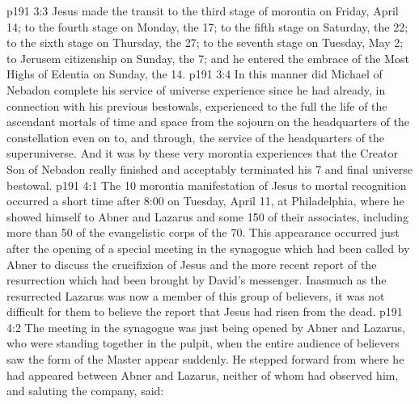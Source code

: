 \vs p191 3:3 Jesus made the transit to the third stage of morontia on Friday, April 14; to the fourth stage on Monday, the 17; to the fifth stage on Saturday, the 22; to the sixth stage on Thursday, the 27; to the seventh stage on Tuesday, May 2; to Jerusem citizenship on Sunday, the 7; and he entered the embrace of the Most Highs of Edentia on Sunday, the 14.
\vs p191 3:4 In this manner did Michael of Nebadon complete his service of universe experience since he had already, in connection with his previous bestowals, experienced to the full the life of the ascendant mortals of time and space from the sojourn on the headquarters of the constellation even on to, and through, the service of the headquarters of the superuniverse. And it was by these very morontia experiences that the Creator Son of Nebadon really finished and acceptably terminated his 7 and final universe bestowal.
\vs p191 4:1 The 10 morontia manifestation of Jesus to mortal recognition occurred a short time after 8:00 on Tuesday, April 11, at Philadelphia, where he showed himself to Abner and Lazarus and some 150 of their associates, including more than 50 of the evangelistic corps of the 70. This appearance occurred just after the opening of a special meeting in the synagogue which had been called by Abner to discuss the crucifixion of Jesus and the more recent report of the resurrection which had been brought by David’s messenger. Inasmuch as the resurrected Lazarus was now a member of this group of believers, it was not difficult for them to believe the report that Jesus had risen from the dead.
\vs p191 4:2 The meeting in the synagogue was just being opened by Abner and Lazarus, who were standing together in the pulpit, when the entire audience of believers saw the form of the Master appear suddenly. He stepped forward from where he had appeared between Abner and Lazarus, neither of whom had observed him, and saluting the company, said:
